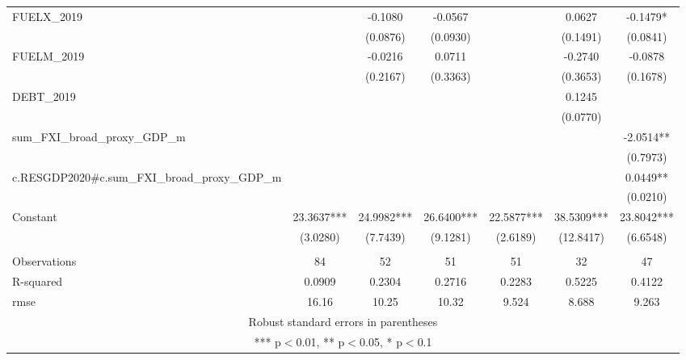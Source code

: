 \documentclass[]{article}
\begin{document}
\begin{tabular}{lcccccc}
FUELX\_2019 &  & -0.1080 & -0.0567 &  & 0.0627 & -0.1479* \\
 &  & (0.0876) & (0.0930) &  & (0.1491) & (0.0841) \\
FUELM\_2019 &  & -0.0216 & 0.0711 &  & -0.2740 & -0.0878 \\
 &  & (0.2167) & (0.3363) &  & (0.3653) & (0.1678) \\
DEBT\_2019 &  &  &  &  & 0.1245 &  \\
 &  &  &  &  & (0.0770) &  \\
sum\_FXI\_broad\_proxy\_GDP\_m &  &  &  &  &  & -2.0514** \\
 &  &  &  &  &  & (0.7973) \\
c.RESGDP2020\#c.sum\_FXI\_broad\_proxy\_GDP\_m &  &  &  &  &  & 0.0449** \\
 &  &  &  &  &  & (0.0210) \\
Constant & 23.3637*** & 24.9982*** & 26.6400*** & 22.5877*** & 38.5309*** & 23.8042*** \\
 & (3.0280) & (7.7439) & (9.1281) & (2.6189) & (12.8417) & (6.6548) \\
 &  &  &  &  &  &  \\
Observations & 84 & 52 & 51 & 51 & 32 & 47 \\
R-squared & 0.0909 & 0.2304 & 0.2716 & 0.2283 & 0.5225 & 0.4122 \\
 rmse & 16.16 & 10.25 & 10.32 & 9.524 & 8.688 & 9.263 \\ \hline
\multicolumn{7}{c}{ Robust standard errors in parentheses} \\
\multicolumn{7}{c}{ *** p$<$0.01, ** p$<$0.05, * p$<$0.1} \\
\end{tabular}
\end{document}
